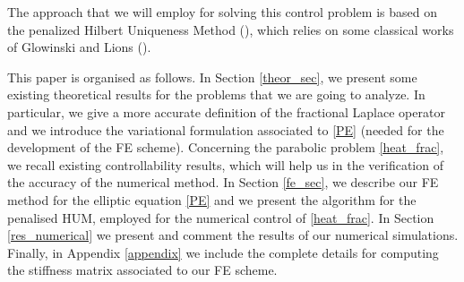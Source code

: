 The approach that we will employ for solving this control problem is based on the penalized Hilbert Uniqueness Method (\cite{boyer2013penalised}), which relies on some classical works of Glowinski and Lions (\cite{glowinski1995exact,glowinski2008exact}).   

This paper is organised as follows. In Section \ref{theor_sec}, we present some existing theoretical results for the problems that we are going to analyze. In particular, we give a more accurate definition of the fractional Laplace operator and we introduce the variational formulation associated to \eqref{PE} (needed for the development of the FE scheme). Concerning the parabolic problem \eqref{heat_frac}, we recall existing controllability results, which will help us in the verification of the accuracy of the numerical method. In Section \ref{fe_sec}, we describe our FE method for the elliptic equation \eqref{PE} and we present the algorithm for the penalised HUM, employed for the numerical control of \eqref{heat_frac}. In Section \ref{res_numerical} we present and comment the results of our numerical simulations. Finally, in Appendix \ref{appendix} we include the complete details for computing the stiffness matrix associated to our FE scheme.  

